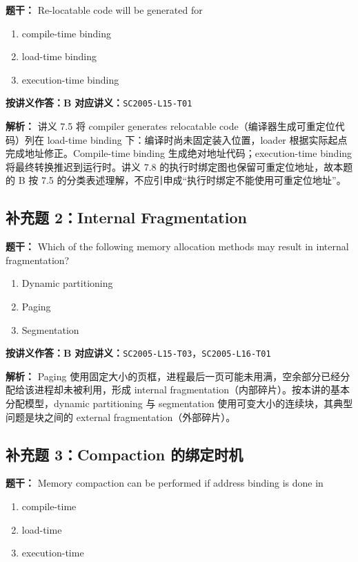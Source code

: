\documentclass[11pt,a4paper,fontset=fandol]{ctexart}
\renewcommand{\exercisequestion}[2]{%
  \Needspace{5\baselineskip}%
  \subsection{#2}\label{exercise:#1}%
}
\renewenvironment{checkedsolution}
  {\par\nopagebreak[4]\textbf{解析：}\ignorespaces}
  {\par}
\begin{document}
\textbf{题干：} Re-locatable code will be generated for

\begin{enumerate}[label=\Alph*.,leftmargin=2.4em]
  \item compile-time binding
  \item load-time binding
  \item execution-time binding
\end{enumerate}

\textbf{按讲义作答：B}\qquad
\textbf{对应讲义：}\texttt{SC2005-L15-T01}

\begin{checkedsolution}
讲义 7.5 将 compiler generates relocatable code（编译器生成可重定位代码）列在 load-time binding 下：编译时尚未固定装入位置，loader 根据实际起点完成地址修正。Compile-time binding 生成绝对地址代码；execution-time binding 将最终转换推迟到运行时。讲义 7.8 的执行时绑定图也保留可重定位地址，故本题的 B 按 7.5 的分类表述理解，不应引申成“执行时绑定不能使用可重定位地址”。
\end{checkedsolution}

\exercisequestion{SC2005-HW05-Q07}{补充题 2：Internal Fragmentation}

\textbf{题干：} Which of the following memory allocation methods may result in internal fragmentation?

\begin{enumerate}[label=\Alph*.,leftmargin=2.4em]
  \item Dynamic partitioning
  \item Paging
  \item Segmentation
\end{enumerate}

\textbf{按讲义作答：B}\qquad
\textbf{对应讲义：}\texttt{SC2005-L15-T03}，\texttt{SC2005-L16-T01}

\begin{checkedsolution}
Paging 使用固定大小的页框，进程最后一页可能未用满，空余部分已经分配给该进程却未被利用，形成 internal fragmentation（内部碎片）。按本讲的基本分配模型，dynamic partitioning 与 segmentation 使用可变大小的连续块，其典型问题是块之间的 external fragmentation（外部碎片）。
\end{checkedsolution}

\exercisequestion{SC2005-HW05-Q08}{补充题 3：Compaction 的绑定时机}

\textbf{题干：} Memory compaction can be performed if address binding is done in

\begin{enumerate}[label=\Alph*.,leftmargin=2.4em]
  \item compile-time
  \item load-time
  \item execution-time
\end{enumerate}
\end{document}
